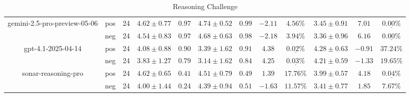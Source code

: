 \begin{table}[ht!]
{\begin{tabular}{| c || c | c || c | c || c | c | c | c || c | c | c ||}
      gemini-2.5-pro-preview-05-06
        & pos
        & 24
        & $4.62 \pm 0.77$
        & $0.97$
        & $4.74 \pm 0.52$
        & $0.99$
        & $-2.11$
        & $4.56\text{\%}$
        & $3.45 \pm 0.91$
        & $7.01$
        & $\underline{\mathbf{0.00\%}}$ \\
        & neg
        & 24
        & $4.54 \pm 0.83$
        & $0.97$
        & $4.68 \pm 0.63$
        & $0.98$
        & $-2.18$
        & $3.94\text{\%}$
        & $3.36 \pm 0.96$
        & $6.16$
        & $\underline{\mathbf{0.00\%}}$ \\
    \hline


      gpt-4.1-2025-04-14
        & pos
        & 24
        & $4.08 \pm 0.88$
        & $0.90$
        & $3.39 \pm 1.62$
        & $0.91$
        & $4.38$
        & $\underline{\mathbf{0.02\%}}$
        & $4.28 \pm 0.63$
        & $-0.91$
        & $37.24\text{\%}$ \\
        & neg
        & 24
        & $3.83 \pm 1.27$
        & $0.79$
        & $3.14 \pm 1.62$
        & $0.84$
        & $4.25$
        & $\underline{\mathbf{0.03\%}}$
        & $4.21 \pm 0.59$
        & $-1.33$
        & $19.65\text{\%}$ \\
    \hline


      sonar-reasoning-pro
        & pos
        & 24
        & $4.62 \pm 0.65$
        & $0.41$
        & $4.51 \pm 0.79$
        & $0.49$
        & $1.39$
        & $17.76\text{\%}$
        & $3.99 \pm 0.57$
        & $4.18$
        & $\underline{\mathbf{0.04\%}}$ \\
        & neg
        & 24
        & $4.00 \pm 1.44$
        & $0.24$
        & $4.39 \pm 0.94$
        & $0.51$
        & $-1.63$
        & $11.57\text{\%}$
        & $3.41 \pm 0.77$
        & $1.85$
        & $7.67\text{\%}$ \\
    \hline


      \hline
    \end{tabular}
  }
  \caption{Reasoning Challenge}
  \label{tbleval-question-answers}
\end{table}

